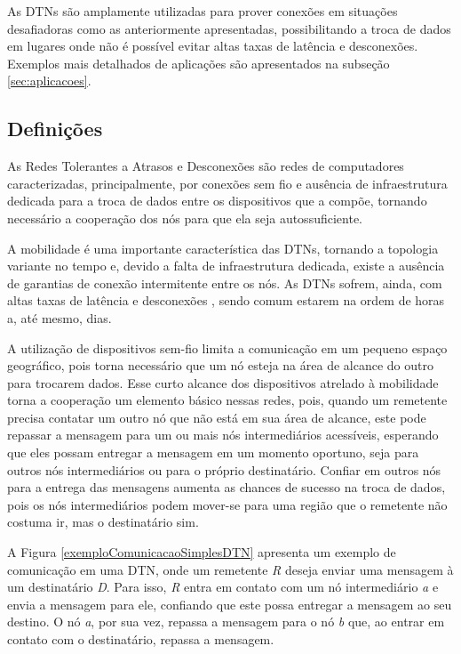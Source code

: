 As DTNs são amplamente utilizadas para prover conexões em situações desafiadoras como as anteriormente apresentadas, possibilitando a troca de dados em lugares onde não é possível evitar altas taxas de latência e desconexões. Exemplos mais detalhados de aplicações são apresentados na subseção \ref{sec:aplicacoes}.

\subsection{Definições}\label{sec:definicoes}

As Redes Tolerantes a Atrasos e Desconexões são redes de computadores caracterizadas, principalmente, por conexões sem fio e ausência de infraestrutura dedicada para a troca de dados entre os dispositivos que a compõe, tornando necessário a cooperação dos nós para que ela seja autossuficiente. 

A mobilidade é uma importante característica das DTNs, tornando a topologia variante no tempo e, devido a falta de infraestrutura dedicada, existe a ausência de garantias de conexão intermitente entre os nós. As DTNs sofrem, ainda, com altas taxas de latência e desconexões \cite{fall2003delay}, sendo comum estarem na ordem de horas a, até mesmo, dias.

A utilização de dispositivos sem-fio limita a comunicação em um pequeno espaço geográfico, pois torna necessário que um nó esteja na área de alcance do outro para trocarem dados. Esse curto alcance dos dispositivos atrelado à mobilidade torna a cooperação um elemento básico nessas redes, pois, quando um remetente precisa contatar um outro nó que não está em sua área de alcance, este pode repassar a mensagem para um ou mais nós intermediários acessíveis, esperando que eles possam entregar a mensagem em um momento oportuno, seja para outros nós intermediários ou para o próprio destinatário. Confiar em outros nós para a entrega das mensagens aumenta as chances de sucesso na troca de dados, pois os nós intermediários podem mover-se para uma região que o remetente não costuma ir, mas o destinatário sim.

A Figura \ref{exemploComunicacaoSimplesDTN} apresenta um exemplo de comunicação em uma DTN, onde um remetente \emph{R} deseja enviar uma mensagem à um destinatário \emph{D}. Para isso, \emph{R} entra em contato com um nó intermediário \emph{a} e envia a mensagem para ele, confiando que este possa entregar a mensagem ao seu destino. O nó \emph{a}, por sua vez, repassa a mensagem para o nó \emph{b} que, ao entrar em contato com o destinatário, repassa a mensagem.

